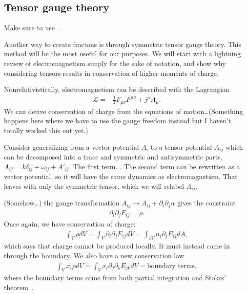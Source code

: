 \documentclass[a4paper,12pt]{article}
\renewcommand{\th}[1]{\frac{1}{#1}}
\begin{document}
\subsection{Tensor gauge theory} \label{sub:tensor}

Make sure to use~\cite{PretkoFractonGauge}.

Another way to create fractons is through symmetric tensor gauge theory. This method will be the most useful for our purposes. We will start with a lightning review of electromagnetism simply for the sake of notation, and show why considering tensors results in conservation of higher moments of charge. 

Nonrelativistically, electromagnetism can be described with the Lagrangian \cite{TongQft}
\begin{align}
\mathcal{L} = -\th{4}F_{\mu\nu}F^{\mu\nu} + j^\mu A_\mu.
\end{align}
We can derive conservation of charge from the equations of motion\dots (Something happens here where we have to use the gauge freedom instead but I haven't totally worked this out yet.)

Consider generalizing from a vector potential $A_{i}$ to a tensor potential $A_{ij}$ which can be decomposed into a trace and symmetric and antisymmetric parts, $A_{ij} = k\delta_{ij} + \tilde{\omega}_{ij} + A'_{ij}$. The first term\dots. The second term can be rewritten as a vector potential, so it will have the same dynamics as electromagnetism. That leaves with only the symmetric tensor, which we will relabel $A_{ij}$.

(Somehow\dots) the gauge transformation $A_{ij}\to A_{ij}+\partial_i\partial_j\alpha$ gives the constraint 
\begin{align}
\partial_i\partial_jE_{ij}=\rho.\label{eqn:dipole}
\end{align}
Once again, we have conservation of charge:
\begin{align}
\int_V\rho dV = \int_V \partial_i\partial_j E_{ij}dV = \int_{\partial V}n_i\partial_jE_{ij}dA,
\end{align}
which says that charge cannot be produced locally. It must instead come in through the boundary. We also have a new conservation law
\begin{align}
\int_Vx_i\rho dV = \int_V x_i\partial_j\partial_k E_{jk}dV = \text{boundary terms},
\end{align}
where the boundary terms come from both partial integration and Stokes' theorem~\cite{NandkishoreFractons}.
\end{document}
